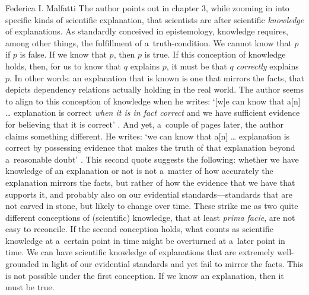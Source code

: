 \begin{recengenv}{Federica I. Malfatti}
\enlargethispage{1.5\baselineskip}
The author points out in chapter 3, while zooming in into specific kinds of scientific explanation, that scientists are after scientific \textit{knowledge} of explanations. As standardly conceived in epistemology, knowledge requires, among other things, the fulfillment of a~truth-condition. We cannot know that $p$ if $p$ is false. If we know that $p$, then $p$ is true. If this conception of knowledge holds, then, for us to know that $q$ explains $p$, it must be that $q$ \textit{correctly} explains $p$. In other words: an explanation that is known is one that mirrors the facts, that depicts dependency relations actually holding in the real world. The author seems to align to this conception of knowledge when he writes: ‘[w]e can know that a[n] … explanation is correct \textit{when it is in fact correct} and we have sufficient evidence for believing that it is correct'
\parencite[][p.38, emphasis added]{mccain_understanding_2022}. %
 And yet, a~couple of pages later, the author claims something different. He writes: ‘we can know that a[n] … explanation is correct by possessing evidence that makes the truth of that explanation beyond a~reasonable doubt' 
\parencite[][p.40]{mccain_understanding_2022}. %
 This second quote suggests the following: whether we have knowledge of an explanation or not is not a~matter of how accurately the explanation mirrors the facts, but rather of how the evidence that we have that supports it, and probably also on our evidential standards---standards that are not carved in stone, but likely to change over time. These strike me as two quite different conceptions of (scientific) knowledge, that at least \textit{prima facie}, are not easy to reconcile. If the second conception holds, what counts as scientific knowledge at a~certain point in time might be overturned at a~later point in time. We can have scientific knowledge of explanations that are extremely well-grounded in light of our evidential standards and yet fail to mirror the facts. This is not possible under the first conception. If we know an explanation, then it must be true.


\end{recengenv}
